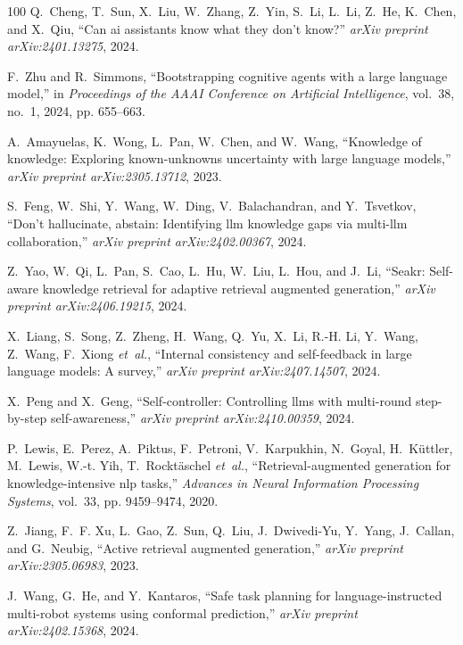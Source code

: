 \documentclass[10pt,journal,compsoc]{IEEEtran}
\begin{document}
\begin{thebibliography}{100}
	Q.~Cheng, T.~Sun, X.~Liu, W.~Zhang, Z.~Yin, S.~Li, L.~Li, Z.~He, K.~Chen, and
	X.~Qiu, ``Can ai assistants know what they don't know?'' \emph{arXiv preprint
		arXiv:2401.13275}, 2024.
	
	F.~Zhu and R.~Simmons, ``Bootstrapping cognitive agents with a large language
	model,'' in \emph{Proceedings of the AAAI Conference on Artificial
		Intelligence}, vol.~38, no.~1, 2024, pp. 655--663.
	
	A.~Amayuelas, K.~Wong, L.~Pan, W.~Chen, and W.~Wang, ``Knowledge of knowledge:
	Exploring known-unknowns uncertainty with large language models,''
	\emph{arXiv preprint arXiv:2305.13712}, 2023.
	
	S.~Feng, W.~Shi, Y.~Wang, W.~Ding, V.~Balachandran, and Y.~Tsvetkov, ``Don't
	hallucinate, abstain: Identifying llm knowledge gaps via multi-llm
	collaboration,'' \emph{arXiv preprint arXiv:2402.00367}, 2024.
	
	Z.~Yao, W.~Qi, L.~Pan, S.~Cao, L.~Hu, W.~Liu, L.~Hou, and J.~Li, ``Seakr:
	Self-aware knowledge retrieval for adaptive retrieval augmented generation,''
	\emph{arXiv preprint arXiv:2406.19215}, 2024.
	
	X.~Liang, S.~Song, Z.~Zheng, H.~Wang, Q.~Yu, X.~Li, R.-H. Li, Y.~Wang, Z.~Wang,
	F.~Xiong \emph{et~al.}, ``Internal consistency and self-feedback in large
	language models: A survey,'' \emph{arXiv preprint arXiv:2407.14507}, 2024.
	
	X.~Peng and X.~Geng, ``Self-controller: Controlling llms with multi-round
	step-by-step self-awareness,'' \emph{arXiv preprint arXiv:2410.00359}, 2024.
	
	P.~Lewis, E.~Perez, A.~Piktus, F.~Petroni, V.~Karpukhin, N.~Goyal,
	H.~K{\"u}ttler, M.~Lewis, W.-t. Yih, T.~Rockt{\"a}schel \emph{et~al.},
	``Retrieval-augmented generation for knowledge-intensive nlp tasks,''
	\emph{Advances in Neural Information Processing Systems}, vol.~33, pp.
	9459--9474, 2020.
	
	Z.~Jiang, F.~F. Xu, L.~Gao, Z.~Sun, Q.~Liu, J.~Dwivedi-Yu, Y.~Yang, J.~Callan,
	and G.~Neubig, ``Active retrieval augmented generation,'' \emph{arXiv
		preprint arXiv:2305.06983}, 2023.
	
	J.~Wang, G.~He, and Y.~Kantaros, ``Safe task planning for language-instructed
	multi-robot systems using conformal prediction,'' \emph{arXiv preprint
		arXiv:2402.15368}, 2024.
	

\end{thebibliography}
\end{document}

